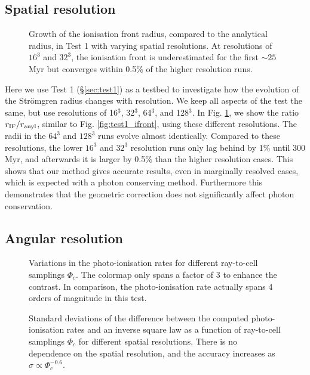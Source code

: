 \documentclass[useAMS,usenatbib]{mn2e}
\begin{document}
\subsection{Spatial resolution}
\label{sec:dx_dep}

\begin{figure}
  \caption{\label{fig:dx_dep1} Growth of the ionisation front radius,
    compared to the analytical radius, in Test 1 with varying spatial
    resolutions.  At resolutions of $16^3$ and $32^3$, the ionisation
    front is underestimated for the first $\sim25$ Myr but converges
    within 0.5\% of the higher resolution runs.}
\end{figure}

Here we use Test 1 (\S\ref{sec:test1}) as a testbed to investigate how
the evolution of the Str\"{o}mgren radius changes with resolution.  We
keep all aspects of the test the same, but use resolutions of 16$^3$,
32$^3$, 64$^3$, and 128$^3$.  In Fig. \ref{fig:dx_dep1}, we show the
ratio $r_{\rm IF}/r_{\rm anyl}$, similar to Fig.
\ref{fig:test1_ifront}, using these different resolutions.  The radii
in the $64^3$ and $128^3$ runs evolve almost identically.  Compared to
these resolutions, the lower $16^3$ and $32^3$ resolution runs only
lag behind by 1\% until 300 Myr, and afterwards it is larger by 0.5\%
than the higher resolution cases.  This shows that our method gives
accurate results, even in marginally resolved cases, which is expected
with a photon conserving method.  Furthermore this demonstrates that
the geometric correction does not significantly affect photon
conservation.

\subsection{Angular resolution}
\label{sec:ang_dep}

\begin{figure}
  \caption{\label{fig:ang_dep1} Variations in the photo-ionisation
    rates for different ray-to-cell samplings $\Phi_c$.  The colormap
    only spans a factor of 3 to enhance the contrast.  In comparison,
    the photo-ionisation rate actually spans 4 orders of magnitude in
    this test.}
\end{figure}

\begin{figure}
  \caption{\label{fig:ang_dep2} Standard deviations of the difference
    between the computed photo-ionisation rates and an inverse square
    law as a function of ray-to-cell samplings $\Phi_c$ for different
    spatial resolutions.  There is no dependence on the spatial
    resolution, and the accuracy increases as $\sigma \propto
    \Phi_c^{-0.6}$.}
\end{figure}
\end{document}
